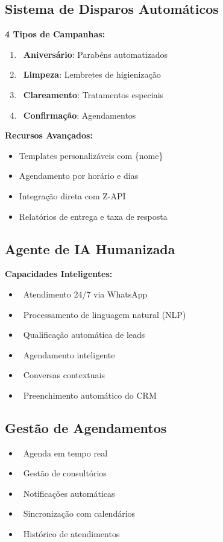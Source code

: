 \documentclass[11pt,a4paper]{article}
\begin{document}
\subsection{Sistema de Disparos Automáticos}
\begin{tcolorbox}[colback=green!5!white,colframe=successgreen]
\textbf{4 Tipos de Campanhas:}
\begin{enumerate}
    \item \faBirthdayCake\ \textbf{Aniversário}: Parabéns automatizados
    \item \faTooth\ \textbf{Limpeza}: Lembretes de higienização
    \item \faStar\ \textbf{Clareamento}: Tratamentos especiais
    \item \faCalendarCheck\ \textbf{Confirmação}: Agendamentos
\end{enumerate}

\textbf{Recursos Avançados:}
\begin{itemize}
    \item Templates personalizáveis com \{nome\}
    \item Agendamento por horário e dias
    \item Integração direta com Z-API
    \item Relatórios de entrega e taxa de resposta
\end{itemize}
\end{tcolorbox}

\subsection{Agente de IA Humanizada}
\begin{tcolorbox}[colback=amber!5!white,colframe=warningamber]
\textbf{Capacidades Inteligentes:}
\begin{itemize}
    \item \faRobot\ Atendimento 24/7 via WhatsApp
    \item \faBrain\ Processamento de linguagem natural (NLP)
    \item \faUserPlus\ Qualificação automática de leads
    \item \faCalendarAlt\ Agendamento inteligente
    \item \faComments\ Conversas contextuais
    \item \faDatabase\ Preenchimento automático do CRM
\end{itemize}
\end{tcolorbox}

\subsection{Gestão de Agendamentos}
\begin{itemize}
    \item \faClock\ Agenda em tempo real
    \item \faUserMd\ Gestão de consultórios
    \item \faBell\ Notificações automáticas
    \item \faSync\ Sincronização com calendários
    \item \faHistory\ Histórico de atendimentos
\end{itemize}
\end{document}
